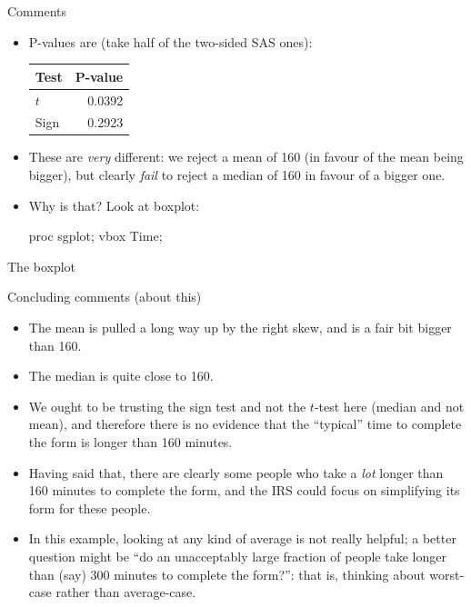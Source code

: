 \documentclass[unknownkeysallowed]{beamer}\usepackage[]{graphicx}\usepackage[]{color}
\begin{document}
\begin{frame}[fragile]{Comments}
  \begin{itemize}
  \item P-values are (take half of the two-sided SAS ones):
    
    \begin{center}
    \begin{tabular}{lr}
      Test & P-value\\
      \hline
      $t$ & 0.0392\\
      Sign & 0.2923\\
      \hline
    \end{tabular}
      
    \end{center}
  \item These are \emph{very} different: we reject a mean of 160 (in
    favour of the mean being bigger), but clearly \emph{fail} to reject a
    median of 160 in favour of a bigger one.
  \item Why is that? Look at boxplot:
    
    \begin{Sascode}[store=in]
proc sgplot;
  vbox Time;
    \end{Sascode}
  \end{itemize}
\end{frame}

\begin{frame}[fragile]{The boxplot}
  

  
\end{frame}

\begin{frame}[fragile]{Concluding comments (about this)}
  
  \begin{itemize}
  \item The mean is pulled a long way up by the right skew, and is a
    fair bit bigger than 160.
  \item The median is quite close to 160.
  \item We ought to be trusting the sign test and not the $t$-test
    here (median and not mean), and therefore there is no evidence
    that the ``typical'' time to complete the form is longer than 160
    minutes. 
  \item Having said that, there are clearly some people who take a
    \emph{lot} longer than 160 minutes to complete the form, and the
    IRS could focus on simplifying its form for these people.
  \item In this example, looking at any kind of average is not really
    helpful; a better question might be ``do an unacceptably large
    fraction of people take longer than (say) 300 minutes to complete
    the form?'': that is, thinking about worst-case rather than
    average-case.
  \end{itemize}
  
\end{frame}
\end{document}
